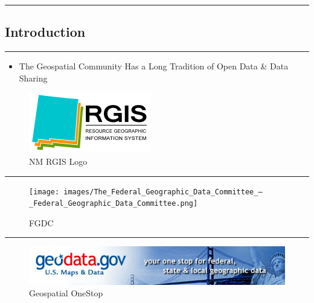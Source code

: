 \begin{center}\rule{0.5\linewidth}{\linethickness}\end{center}

\subsection{Introduction}\label{introduction}

\begin{center}\rule{0.5\linewidth}{\linethickness}\end{center}

\begin{itemize}
\itemsep1pt\parskip0pt
\item
  The Geospatial Community Has a Long Tradition of Open Data \& Data
  Sharing
\end{itemize}

\begin{figure}[htbp]
\centering
\includegraphics{images/NMRGIS_Logo.png}
\caption{NM RGIS Logo}
\end{figure}

\begin{center}\rule{0.5\linewidth}{\linethickness}\end{center}

\begin{figure}[htbp]
\centering
\texttt{[image: images/The\_Federal\_Geographic\_Data\_Committee\_—\_Federal\_Geographic\_Data\_Committee.png]}
\caption{FGDC}
\end{figure}

\begin{center}\rule{0.5\linewidth}{\linethickness}\end{center}

\begin{figure}[htbp]
\centering
\includegraphics{images/geodata_gov.png}
\caption{Geospatial OneStop}
\end{figure}


